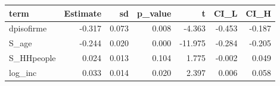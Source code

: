 \begin{tabular}{lrrrrrr}
  \hline
term & Estimate & sd & p\_value & t & CI\_L & CI\_H \\ 
  \hline
dpisofirme & -0.317 & 0.073 & 0.008 & -4.363 & -0.453 & -0.187 \\ 
  S\_age & -0.244 & 0.020 & 0.000 & -11.975 & -0.284 & -0.205 \\ 
  S\_HHpeople & 0.024 & 0.013 & 0.104 & 1.775 & -0.002 & 0.049 \\ 
  log\_inc & 0.033 & 0.014 & 0.020 & 2.397 & 0.006 & 0.058 \\ 
   \hline
\end{tabular}
